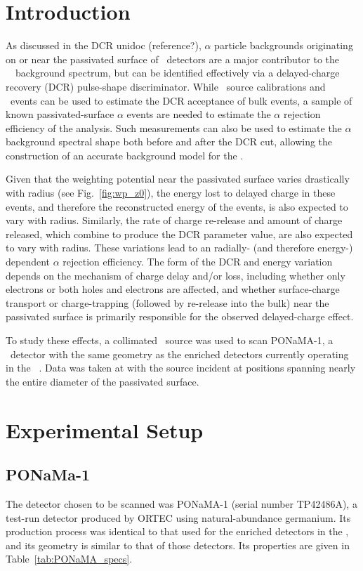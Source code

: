 \section{Introduction}
As discussed in the DCR unidoc (reference?), $\alpha$ particle backgrounds originating on or near the passivated surface of \ppc\ detectors are a major contributor to the \MJ\ \DEM\ background spectrum, but can be identified effectively via a delayed-charge recovery (DCR) pulse-shape discriminator. While \thtte\ source calibrations and \twonubb\ events can be used to estimate the DCR acceptance of bulk events, a sample of known passivated-surface $\alpha$ events are needed to estimate the $\alpha$ rejection efficiency of the analysis. Such measurements can also be used to estimate the $\alpha$ background spectral shape both before and after the DCR cut, allowing the construction of an accurate background model for the \DEM. 

Given that the weighting potential near the passivated surface varies drastically with radius (see Fig.~\ref{fig:wp_z0}), the energy lost to delayed charge in these events, and therefore the reconstructed energy of the events, is also expected to vary with radius. Similarly, the rate of charge re-release and amount of charge released, which combine to produce the DCR parameter value, are also expected to vary with radius. These variations lead to an radially- (and therefore energy-) dependent $\alpha$ rejection efficiency. The form of the DCR and energy variation depends on the mechanism of charge delay and/or loss, including whether only electrons or both holes and electrons are affected, and whether surface-charge transport or charge-trapping (followed by re-release into the bulk) near the passivated surface is primarily responsible for the observed delayed-charge effect. 

To study these effects, a collimated \am\ source was used to scan PONaMA-1, a \ppc\ detector with the same geometry as the enriched detectors currently operating in the \MJ\ \DEM. Data was taken at with the source incident at positions spanning nearly the entire diameter of the passivated surface. 

\section{Experimental Setup}
\subsection{PONaMa-1}
The detector chosen to be scanned was PONaMA-1 (serial number TP42486A), a test-run detector produced by ORTEC using natural-abundance germanium. Its production process was identical to that used for the enriched detectors in the \DEM, and its geometry is similar to that of those detectors. Its properties are given in Table~\ref{tab:PONaMA_specs}. 

